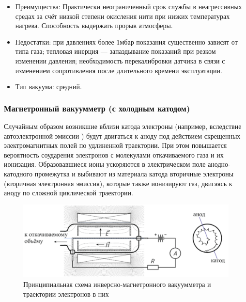 \documentclass[a4paper,12pt]{article}
\theoremstyle{plain} %
\theoremstyle{definition} %
\theoremstyle{remark} %
\begin{document}
\begin{itemize}
	\item Преимущества: Практически неограниченный срок службы в неагрессивных средах за счёт низкой степени окисления нити при низких температурах нагрева. Способность выдержать прорыв атмосферы.
	\item Недостатки: при давлениях более $1\text{мбар}$ показания существенно зависят от типа газа; тепловая инерция — запаздывание показаний при резком изменении давления; необходимость перекалибровки датчика в связи с изменением сопротивления после длительного времени эксплуатации.
	\item Тип вакуума: средний.
\end{itemize}
\subsubsection{Магнетронный вакуумметр (с холодным катодом)}
Случайным образом возникшие вблизи катода электроны (например, вследствие автоэлектронной эмиссии ) будут двигаться к аноду под действием скрещенных электромагнитных полей по удлиненной траектории. При этом повышается вероятность соударения электронов с молекулами откачиваемого газа и их ионизация. Образовавшиеся ионы ускоряются в электрическом поле анодно-катодного промежутка и выбивают из материала катода вторичные электроны (вторичная электронная эмиссия), которые также ионизируют газ, двигаясь к аноду по сложной циклической траектории.

\begin{figure}[H]
	\begin{center}
		\includegraphics[width=\linewidth]{5}
		\captionsetup{justification=centering}
		\caption{Принципиальная схема инверсно-магнетронного вакуумметра и траектории электронов в них}
	\end{center}
\end{figure}
\end{document}
